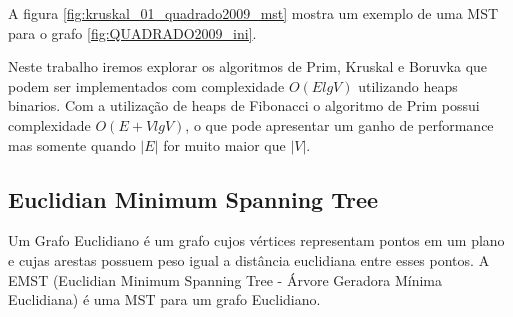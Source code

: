 \documentclass[12pt,a4paper]{article}
\begin{document}

A figura \ref{fig:kruskal_01_quadrado2009_mst} mostra um exemplo de uma MST para
o grafo \ref{fig:QUADRADO2009_ini}.

Neste trabalho iremos explorar os algoritmos de Prim, Kruskal e Boruvka que
podem ser implementados com complexidade $O(E lg V)$ utilizando heaps binarios.
Com a utilização de heaps de Fibonacci o algoritmo de Prim possui complexidade
$O(E + V lg V)$, o que pode apresentar um ganho de performance mas somente
quando $|E|$ for muito maior que $|V|$.

\subsection{Euclidian Minimum Spanning Tree}


Um Grafo Euclidiano é um grafo cujos vértices representam pontos em um plano e
cujas arestas possuem peso igual a distância euclidiana entre esses pontos. A
EMST (Euclidian Minimum Spanning Tree - Árvore Geradora Mínima Euclidiana) é uma
MST para um grafo Euclidiano. 



\end{document}
